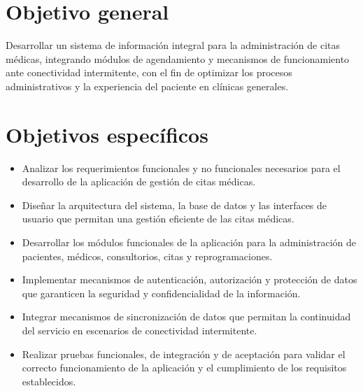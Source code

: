 \section{Objetivo general}

Desarrollar un sistema de información integral para la administración de citas médicas, integrando módulos de agendamiento y mecanismos de funcionamiento ante conectividad intermitente, con el fin de optimizar los procesos administrativos y la experiencia del paciente en clínicas generales.

\section{Objetivos específicos}

\begin{itemize}
	\item Analizar los requerimientos funcionales y no funcionales necesarios para el desarrollo de la aplicación de gestión de citas médicas.
	
	\item Diseñar la arquitectura del sistema, la base de datos y las interfaces de usuario que permitan una gestión eficiente de las citas médicas.
	
	\item Desarrollar los módulos funcionales de la aplicación para la administración de pacientes, médicos, consultorios, citas y reprogramaciones.
	
	\item Implementar mecanismos de autenticación, autorización y protección de datos que garanticen la seguridad y confidencialidad de la información.
	
	\item Integrar mecanismos de sincronización de datos que permitan la continuidad del servicio en escenarios de conectividad intermitente.
	
	\item Realizar pruebas funcionales, de integración y de aceptación para validar el correcto funcionamiento de la aplicación y el cumplimiento de los requisitos establecidos.
\end{itemize}